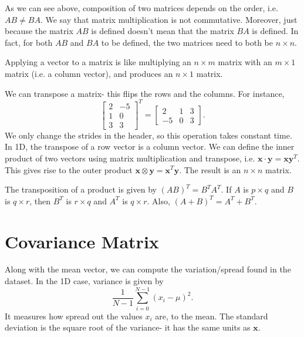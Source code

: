 \documentclass[a4paper, openany]{memoir}
\begin{document}
    As we can see above, composition of two matrices depends on the order, i.e. $AB \neq BA$. We say that matrix multiplication is not commutative. Moreover, just because the matrix $AB$ is defined doesn't mean that the matrix $BA$ is defined. In fact, for both $AB$ and $BA$ to be defined, the two matrices need to both be $n \times n$.

    Applying a vector to a matrix is like multiplying an $n \times m$ matrix with an $m \times 1$ matrix (i.e. a column vector), and produces an $n \times 1$ matrix.

    We can transpose a matrix- this flips the rows and the columns. For instance,
    \[\begin{bmatrix}
        2 & -5 \\
        1 & 0 \\
        3 & 3
    \end{bmatrix}^T = \begin{bmatrix}
        2 & 1 & 3 \\
        -5 & 0 & 3
    \end{bmatrix}.\]
    We only change the strides in the header, so this operation takes constant time. In 1D, the transpose of a row vector is a column vector. We can define the inner product of two vectors using matrix multiplication and transpose, i.e. $\mathbf{x} \cdot \mathbf{y} = \mathbf{x}\mathbf{y}^T$. This gives rise to the outer product $\mathbf{x} \otimes \mathbf{y} = \mathbf{x}^T \mathbf{y}$. The result is an $n \times n$ matrix.

    The transposition of a product is given by $(AB)^T = B^T A^T$. If $A$ is $p \times q$ and $B$ is $q \times r$, then $B^T$ is $r \times q$ and $A^T$ is $q \times r$. Also, $(A + B)^T = A^T + B^T$.
    \newpage

    \section{Covariance Matrix}
    Along with the mean vector, we can compute the variation/spread found in the dataset. In the 1D case, variance is given by
    \[\frac{1}{N-1} \sum_{i=0}^{N-1} (x_i - \mu)^2.\]
    It measures how spread out the values $x_i$ are, to the mean. The standard deviation is the square root of the variance- it has the same units as $\mathbf{x}$.
\end{document}

